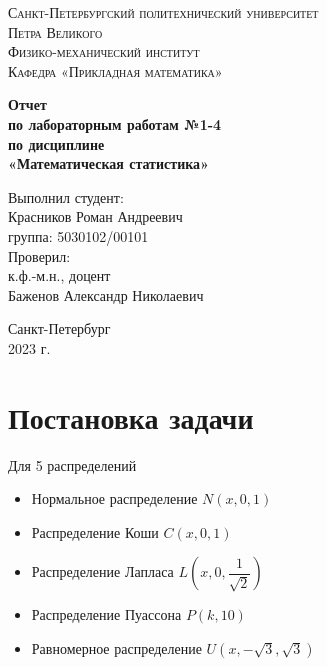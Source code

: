 \documentclass[12pt]{article}
\begin{document}
	\begin{titlepage}
		\begin{center}
			\textsc{Санкт-Петербургский политехнический университет\\Петра Великого\\[5mm]
				Физико-механический институт\\[2mm]
				Кафедра «Прикладная математика»}
			
			\vfill
			
			\textbf{Отчет\\по лабораторным работам №1-4\\по дисциплине\\«Математическая статистика»
				\\[26mm]
			}
		\end{center}
		
		\noindent
		\hspace*{100mm} Выполнил студент:\\[3mm]
		\hspace*{100mm} Красников Роман Андреевич\\
		\hspace*{100mm} группа: 5030102/00101\\[10mm]
		\hspace*{100mm} Проверил:\\[3mm]
		\hspace*{100mm} к.ф.-м.н., доцент\\
		\hspace*{100mm} Баженов Александр Николаевич
		
		\vspace*{\fill}
		\begin{center}
			Санкт-Петербург\\2023 г.
		\end{center}
	\end{titlepage}

	\newpage
	\tableofcontents
	\newpage
	\listoffigures
	\newpage
	\listoftables
	\newpage

	\section{Постановка задачи}
	
	Для 5 распределений
	
	\begin{itemize}
		\item Нормальное распределение $N(x,0,1)$
		\item Распределение Коши $C(x, 0, 1)$
		\item Распределение Лапласа $L\left(x, 0, \dfrac{1}{\sqrt{2}}\right)$
		\item Распределение Пуассона $P(k, 10)$
		\item Равномерное распределение $U(x, -\sqrt{3}, \sqrt{3})$
	\end{itemize}
\end{document}
